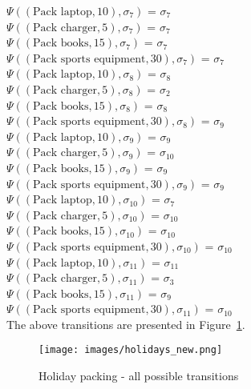 \documentclass[a4paper]{article}
\begin{document}
$\Psi((\text{Pack laptop},10),\sigma_7)$ = $\sigma_7$ \\[0.1\baselineskip] 
$\Psi((\text{Pack charger},5),\sigma_7)$ = $\sigma_7$ \\[0.1\baselineskip] 
$\Psi((\text{Pack books},15),\sigma_7)$ = $\sigma_7$ \\[0.1\baselineskip] 
$\Psi((\text{Pack sports equipment},30),\sigma_7)$ = $\sigma_7$ \\[0.7\baselineskip]
$\Psi((\text{Pack laptop},10),\sigma_8)$ = $\sigma_8$ \\[0.1\baselineskip] 
$\Psi((\text{Pack charger},5),\sigma_8)$ = $\sigma_2$ \\[0.1\baselineskip] 
$\Psi((\text{Pack books},15),\sigma_8)$ = $\sigma_8$ \\[0.1\baselineskip] 
$\Psi((\text{Pack sports equipment},30),\sigma_8)$ = $\sigma_9$ \\[0.7\baselineskip]
$\Psi((\text{Pack laptop},10),\sigma_9)$ = $\sigma_9$ \\[0.1\baselineskip] 
$\Psi((\text{Pack charger},5),\sigma_9)$ = $\sigma_{10}$ \\[0.1\baselineskip] 
$\Psi((\text{Pack books},15),\sigma_9)$ = $\sigma_9$ \\[0.1\baselineskip] 
$\Psi((\text{Pack sports equipment},30),\sigma_9)$ = $\sigma_9$ \\[0.7\baselineskip]
$\Psi((\text{Pack laptop},10),\sigma_{10})$ = $\sigma_7$ \\[0.1\baselineskip] 
$\Psi((\text{Pack charger},5),\sigma_{10})$ = $\sigma_{10}$ \\[0.1\baselineskip] 
$\Psi((\text{Pack books},15),\sigma_{10})$ = $\sigma_{10}$ \\[0.1\baselineskip] 
$\Psi((\text{Pack sports equipment},30),\sigma_{10})$ = $\sigma_{10}$ \\[0.7\baselineskip]
$\Psi((\text{Pack laptop},10),\sigma_{11})$ = $\sigma_{11}$ \\[0.1\baselineskip] 
$\Psi((\text{Pack charger},5),\sigma_{11})$ = $\sigma_3$ \\[0.1\baselineskip] 
$\Psi((\text{Pack books},15),\sigma_{11})$ = $\sigma_9$ \\[0.1\baselineskip] 
$\Psi((\text{Pack sports equipment},30),\sigma_{11})$ = $\sigma_{10}$ \\[0.7\baselineskip]
The above transitions are presented in Figure~\ref{fig:holidays_transitions}.
\begin{figure}[H]
    \centering
    \texttt{[image: images/holidays\_new.png]}
    \caption{Holiday packing - all possible transitions}
    \label{fig:holidays_transitions}
\end{figure}
\end{document}
